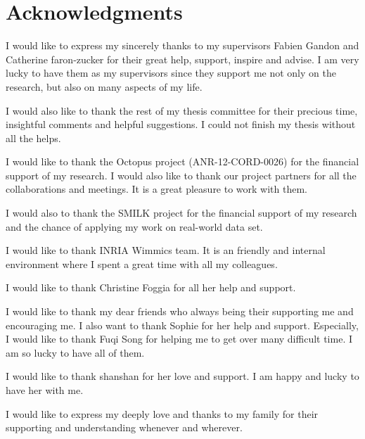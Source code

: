 \documentclass[a4paper,11pt,twoside]{ThesisStyle}
\begin{document}


\doublespacing
\dominitoc


 \cleardoublepage

\section*{Acknowledgments}

I would like to express my sincerely thanks to my supervisors Fabien Gandon and Catherine faron-zucker for their great help, support, inspire and advise. I am very lucky to have them as my supervisors since they support me not only on the research, but also on many aspects of my life. 

I would also like to thank the rest of my thesis committee for their precious time, insightful comments and helpful suggestions. I could not finish my thesis without all the helps.

I would like to thank the Octopus project (ANR-12-CORD-0026) for the financial support of my research. I would also like to thank our project partners for all the collaborations and meetings. It is a great pleasure to work with them.

I would also to thank the SMILK project for the financial support of my research and the chance of applying my work on real-world data set.

I would like to thank INRIA Wimmics team. It is an friendly and internal environment where I spent a great time with all my colleagues.

I would like to thank Christine Foggia for all her help and support.

I would like to thank my dear friends who always being their supporting me and encouraging me. I also want to thank Sophie for her help and support. Especially, I would like to thank Fuqi Song for helping me to get over many difficult time. I am so lucky to have all of them.

I would like to thank shanshan for her love and support. I am happy and lucky to have her with me.

I would like to express my deeply love and thanks to my family for their supporting and understanding whenever and wherever.  







\cleardoublepage
\end{document}
